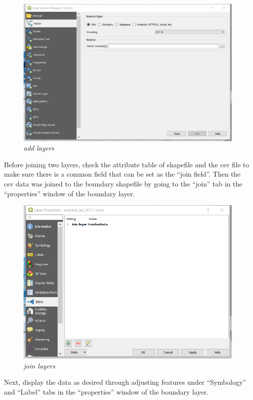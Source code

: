 \documentclass[]{article}
\begin{document}
\begin{figure}
\centering
\includegraphics{Part1/pngs/add_layer.png}
\caption{\emph{add layers}}
\end{figure}

Before joining two layers, check the attribute table of shapefile and
the csv file to make sure there is a common field that can be set as the
``join field''. Then the csv data was joined to the boundary shapefile
by going to the ``join'' tab in the ``properties'' window of the
boundary layer.

\begin{figure}
\centering
\includegraphics{Part1/pngs/join_layer.png}
\caption{\emph{join layers}}
\end{figure}

Next, display the data as desired through adjusting features under
``Symbology'' and ``Label'' tabs in the ``properties'' window of the
boundary layer.
\end{document}
